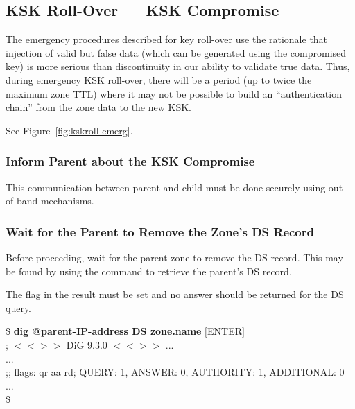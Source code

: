
\clearpage
\subsection{KSK Roll-Over --- KSK Compromise}
\label{roll-emergency-ksk}

The emergency procedures described for key roll-over use the rationale that
injection of valid but false data (which can be generated using the
compromised key) is more serious than discontinuity in our ability to validate
true data. Thus, during emergency KSK roll-over, there will be a period (up
to twice the maximum zone TTL) where it may not be possible to build an
``authentication chain'' from the zone data to the new KSK.

See Figure~\ref{fig:kskroll-emerg}.


\subsubsection{Inform Parent about the KSK Compromise}

This communication between parent and child must be done securely using
out-of-band mechanisms.


\subsubsection{Wait for the Parent to Remove the Zone's DS Record}

Before proceeding, wait for the parent zone to remove the DS record.  This
may be found by using the  command to retrieve the parent's DS record.

The  flag in the result must be set and no answer should be
returned for the DS query.

\begin{tabbing}
\hspace{0.5in}\$ {\bf dig @\underline{parent-IP-address} DS \underline{zone.name}} $[$ENTER$]$ \\
\hspace{0.5in} ; $<$$<$$>$$>$ DiG 9.3.0 $<$$<$$>$$>$ ... \\
\hspace{0.5in} ... \\
\hspace{0.5in} ;; flags: qr aa rd; QUERY: 1, ANSWER: 0, AUTHORITY: 1, ADDITIONAL: 0 \\
\hspace{0.5in} ... \\
\hspace{0.5in}\$ \\
\end{tabbing}

